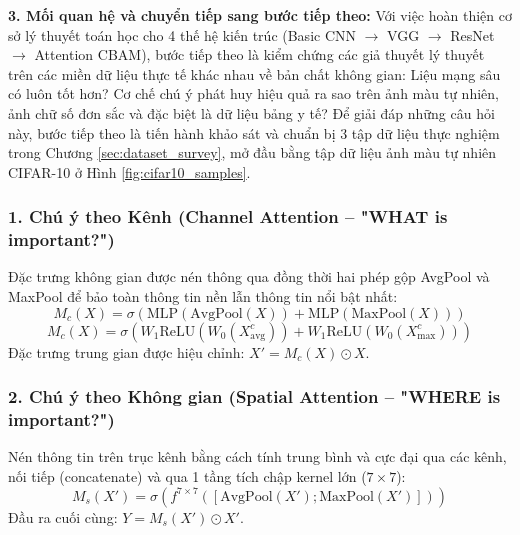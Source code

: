 \documentclass[12pt,a4paper]{article}
\begin{document}
\begin{chartbox}[title={Chú thích \& Phân tích chuyên sâu Sơ đồ khối chú ý CBAM (Hình \ref{fig:cbam_architecture})}]
\vspace{1mm}
\textbf{\color{blue!80!black}3. Mối quan hệ và chuyển tiếp sang bước tiếp theo:}
Với việc hoàn thiện cơ sở lý thuyết toán học cho 4 thế hệ kiến trúc (Basic CNN $\to$ VGG $\to$ ResNet $\to$ Attention CBAM), bước tiếp theo là kiểm chứng các giả thuyết lý thuyết trên các miền dữ liệu thực tế khác nhau về bản chất không gian: Liệu mạng sâu có luôn tốt hơn? Cơ chế chú ý phát huy hiệu quả ra sao trên ảnh màu tự nhiên, ảnh chữ số đơn sắc và đặc biệt là dữ liệu bảng y tế? Để giải đáp những câu hỏi này, bước tiếp theo là tiến hành khảo sát và chuẩn bị 3 tập dữ liệu thực nghiệm trong Chương \ref{sec:dataset_survey}, mở đầu bằng tập dữ liệu ảnh màu tự nhiên CIFAR-10 ở Hình \ref{fig:cifar10_samples}.
\end{chartbox}

\subsubsection{1. Chú ý theo Kênh (Channel Attention -- "WHAT is important?")}
Đặc trưng không gian được nén thông qua đồng thời hai phép gộp AvgPool và MaxPool để bảo toàn thông tin nền lẫn thông tin nổi bật nhất:
\begin{equation}
    M_c(X) = \sigma\left( \text{MLP}(\text{AvgPool}(X)) + \text{MLP}(\text{MaxPool}(X)) \right)
\end{equation}
\begin{equation}
    M_c(X) = \sigma\left( W_1 \text{ReLU}(W_0 (X_{\text{avg}}^c)) + W_1 \text{ReLU}(W_0 (X_{\text{max}}^c)) \right)
\end{equation}
Đặc trưng trung gian được hiệu chỉnh: $X' = M_c(X) \odot X$.

\subsubsection{2. Chú ý theo Không gian (Spatial Attention -- "WHERE is important?")}
Nén thông tin trên trục kênh bằng cách tính trung bình và cực đại qua các kênh, nối tiếp (concatenate) và qua 1 tầng tích chập kernel lớn ($7 \times 7$):
\begin{equation}
    M_s(X') = \sigma\left( f^{7\times 7}\left( [\text{AvgPool}(X'); \text{MaxPool}(X')] \right) \right)
\end{equation}
Đầu ra cuối cùng: $Y = M_s(X') \odot X'$.

\newpage

\end{document}
